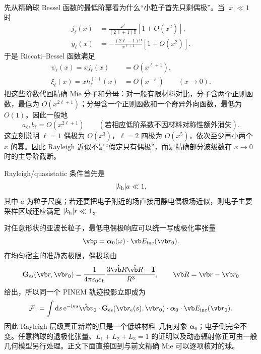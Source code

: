 先从精确球 Bessel 函数的最低阶幂看为什么“小粒子首先只剩偶极”。当 $|x|\ll1$ 时
\begin{align}
j_\ell(x)&=\frac{x^\ell}{(2\ell+1)!!}\left[1+O(x^2)\right],\\
y_\ell(x)&=-\frac{(2\ell-1)!!}{x^{\ell+1}}\left[1+O(x^2)\right].
\label{eq:smallx-spherical-bessel-general}
\end{align}
于是 Riccati--Bessel 函数满足
\begin{align}
\psi_\ell(x)=xj_\ell(x)&=O(x^{\ell+1}),\\
\xi_\ell(x)=xh_\ell^{(1)}(x)&=O(x^{-\ell})
\qquad (x\to0).
\end{align}
把这些阶数代回精确 Mie 分子和分母：对一般有限材料对比，分子含两个正则函数，最低为 $O(x^{2\ell+1})$；分母含一个正则函数和一个奇异外向函数，最低为 $O(1)$。因此一般地
\begin{equation}
{a_\ell,b_\ell=O(x^{2\ell+1})}
\qquad (\text{若相应低阶系数不因材料对称性额外消失}).
\label{eq:mie-multipole-scaling}
\end{equation}
这立刻说明 $\ell=1$ 偶极为 $O(x^3)$，$\ell=2$ 四极为 $O(x^5)$，依次至少再小两个 $x$ 的幂。因此 Rayleigh 近似不是“假定只有偶极”，而是精确部分波级数在 $x\to0$ 时的主导阶截断。

Rayleigh/quasistatic 条件首先是
\begin{equation}
{|k_{\rm h}|a\ll1,}
\label{eq:rayleigh-size-condition}
\end{equation}
其中 $a$ 为粒子尺度；若还要把电子附近的场直接用静电偶极场近似，则电子主要采样区域还应满足 $|k_{\rm h}|r\ll1$。

对任意形状的亚波长粒子，最低电偶极响应可以统一写成极化率张量
\begin{equation}
\vb p=\boldsymbol\alpha_0(\omega)\cdot\vb E_{\rm inc}(\vb r_0).
\label{eq:general-quasistatic-polarizability-def}
\end{equation}
在均匀宿主的准静态极限，偶极场由
\begin{equation}
\mathbf G_{\rm es}(\vb r,\vb r_0)
=\frac{1}{4\pi\varepsilon_0\varepsilon_{\rm h}}
\frac{3\hat{\vb R}\hat{\vb R}-\mathbf I}{R^3},
\qquad \vb R=\vb r-\vb r_0
\end{equation}
给出，所以同一个 PINEM 轨迹投影立即成为
\begin{equation}
{
\mathcal F_{\parallel}
=\int\dd s\,\ee^{-\ii\kappa s}
\hat{\vb v}_0\cdot
\mathbf G_{\rm es}(\vb r_{\rm e}(s),\vb r_0)
\cdot\boldsymbol\alpha_0\cdot\vb E_{\rm inc}(\vb r_0).}
\label{eq:rayleigh-general-tensor-trajectory}
\end{equation}
因此 Rayleigh 层级真正新增的只是一个低维材料--几何对象 $\boldsymbol\alpha_0$；电子侧完全不变。任意椭球的退极化张量、$L_1+L_2+L_3=1$ 的证明以及动态辐射修正可由一般几何模型另行处理。正文下面直接回到与前文精确 Mie 可以逐项核对的球。


